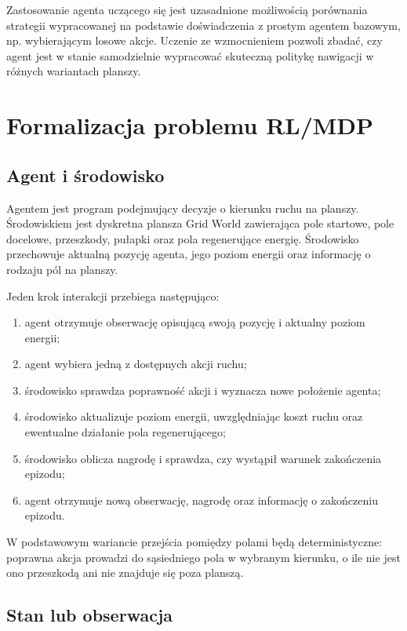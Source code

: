\documentclass[12pt]{article}
\begin{document}
Zastosowanie agenta uczącego się jest uzasadnione możliwością porównania strategii wypracowanej na podstawie doświadczenia z prostym agentem bazowym, np. wybierającym losowe akcje. Uczenie ze wzmocnieniem pozwoli zbadać, czy agent jest w stanie samodzielnie wypracować skuteczną politykę nawigacji w różnych wariantach planszy.

\section{Formalizacja problemu RL/MDP}

\subsection{Agent i środowisko}

Agentem jest program podejmujący decyzje o kierunku ruchu na planszy. Środowiskiem jest dyskretna plansza Grid World zawierająca pole startowe, pole docelowe, przeszkody, pułapki oraz pola regenerujące energię. Środowisko przechowuje aktualną pozycję agenta, jego poziom energii oraz informację o rodzaju pól na planszy.

Jeden krok interakcji przebiega następująco:
\begin{enumerate}
    \item agent otrzymuje obserwację opisującą swoją pozycję i aktualny poziom energii;
    \item agent wybiera jedną z dostępnych akcji ruchu;
    \item środowisko sprawdza poprawność akcji i wyznacza nowe położenie agenta;
    \item środowisko aktualizuje poziom energii, uwzględniając koszt ruchu oraz ewentualne działanie pola regenerującego;
    \item środowisko oblicza nagrodę i sprawdza, czy wystąpił warunek zakończenia epizodu;
    \item agent otrzymuje nową obserwację, nagrodę oraz informację o zakończeniu epizodu.
\end{enumerate}

W podstawowym wariancie przejścia pomiędzy polami będą deterministyczne: poprawna akcja prowadzi do sąsiedniego pola w wybranym kierunku, o ile nie jest ono przeszkodą ani nie znajduje się poza planszą.

\subsection{Stan lub obserwacja}
\end{document}
